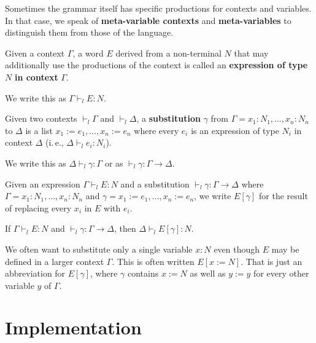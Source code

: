 \begin{remark}
Sometimes the grammar itself has specific productions for contexts and variables.
In that case, we speak of \textbf{meta-variable contexts} and \textbf{meta-variables} to distinguish them from those of the language.
\end{remark}

\begin{definition}
Given a context $\Gamma$, a word $E$ derived from a non-terminal $N$ that may additionally use the productions of the context is called an \textbf{expression of type} $N$ \textbf{in context} $\Gamma$.

We write this as $\Gamma\vdash_l E:N$.
\end{definition}

\begin{definition}[Substitution]
Given two contexts $\vdash_l \Gamma$ and $\vdash_l\Delta$, a \textbf{substitution} $\gamma$ from $\Gamma=x_1:N_1,\ldots,x_n:N_n$ to $\Delta$ is a list $x_1:=e_1,\ldots,x_n:=e_n$ where every $e_i$ is an expression of type $N_i$ in context $\Delta$ (i.\,e., $\Delta\vdash_l e_i:N_i$).

We write this as $\Delta\vdash_l \gamma:\Gamma$ or as $\vdash_l \gamma:\Gamma\to \Delta$.
\end{definition}

\begin{definition}\label{def:subapp}
Given an expression $\Gamma\vdash_l E:N$ and a substitution $\vdash_l\gamma:\Gamma\to\Delta$ where $\Gamma=x_1:N_1,\ldots,x_n:N_n$ and $\gamma=x_1:=e_1,\ldots,x_n:=e_n$, we write $E[\gamma]$ for the result of replacing every $x_i$ in $E$ with $e_i$.
\end{definition}

\begin{theorem}
If $\Gamma\vdash_l E:N$ and $\vdash_l\gamma:\Gamma\to\Delta$, then $\Delta\vdash_l E[\gamma]:N$.
\end{theorem}

We often want to substitute only a single variable $x:N$ even though $E$ may be defined in a larger context $\Gamma$.
This is often written $E[x:=N]$.
That is just an abbreviation for $E[\gamma]$, where $\gamma$ contains $x:=N$ as well as $y:=y$ for every other variable $y$ of $\Gamma$.


\section{Implementation}

